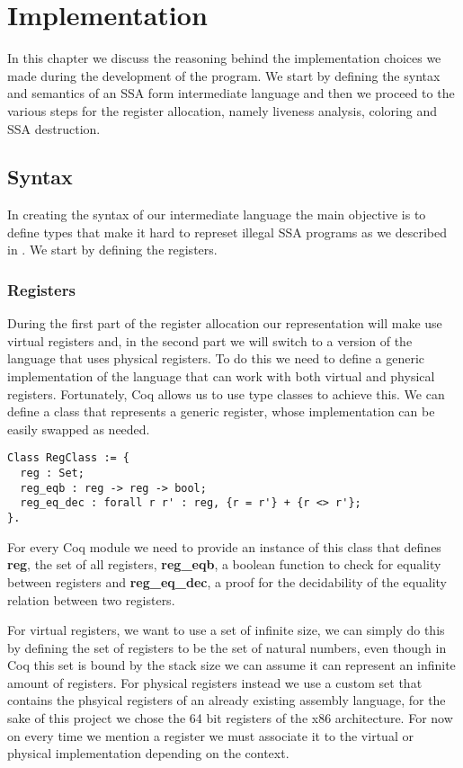 \chapter{Implementation}
\label{cha:implementation}

In this chapter we discuss the reasoning behind the implementation choices we made during the development of the program. We start by defining the syntax and semantics of an SSA form intermediate language and then we proceed to the various steps for the register allocation, namely liveness analysis, coloring and SSA destruction.

\section{Syntax}
In creating the syntax of our intermediate language the main objective is to define types that make it hard to represet illegal SSA programs as we described in . We start by defining the registers.

\subsection{Registers}
During the first part of the register allocation our representation will make use virtual registers and, in the second part we will switch to a version of the language that uses physical registers. To do this we need to define a generic implementation of the language that can work with both virtual and physical registers.
Fortunately, Coq allows us to use type classes to achieve this. We can define a class that represents a generic register, whose implementation can be easily swapped as needed.

\begin{lstlisting}[language=Coq]
Class RegClass := {
  reg : Set;
  reg_eqb : reg -> reg -> bool;
  reg_eq_dec : forall r r' : reg, {r = r'} + {r <> r'};
}.
\end{lstlisting}

For every Coq module we need to provide an instance of this class that defines \textbf{reg}, the set of all registers, \textbf{reg\_eqb}, a boolean function to check for equality between registers and \textbf{reg\_eq\_dec}, a proof for the decidability of the equality relation between two registers.

For virtual registers, we want to use a set of infinite size, we can simply do this by defining the set of registers to be the set of natural numbers, even though in Coq this set is bound by the stack size we can assume it can represent an infinite amount of registers.
For physical registers instead we use a custom set that contains the phsyical registers of an already existing assembly language, for the sake of this project we chose the 64 bit registers of the x86 architecture.
For now on every time we mention a register we must associate it to the virtual or physical implementation depending on the context.


